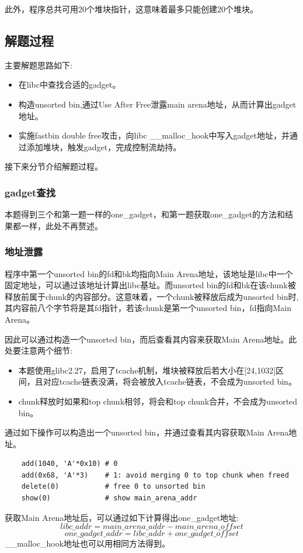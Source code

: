 此外，程序总共可用20个堆块指针，这意味着最多只能创建20个堆块。

\subsection{解题过程}
主要解题思路如下:
\begin{itemize}
    \item 在libc中查找合适的gadget。
    \item 构造unsorted bin,通过Use After Free泄露main arena地址，从而计算出gadget地址。
    \item 实施fastbin double free攻击，向libc \_\_malloc\_hook中写入gadget地址，并通过添加堆块，触发gadget，完成控制流劫持。
\end{itemize}
接下来分节介绍解题过程。

\subsubsection*{gadget查找}
本题得到三个和第一题一样的one\_gadget，和第一题获取one\_gadget的方法和结果都一样，此处不再赘述。

\subsubsection*{地址泄露}
程序中第一个unsorted bin的fd和bk均指向Main Arena地址，该地址是libc中一个固定地址，可以通过该地址计算出libc基址。而unsorted bin的fd和bk在该chunk被释放前属于chunk的内容部分。这意味着，一个chunk被释放后成为unsorted bin时,其内容前八个字节将是其fd指针，若该chunk是第一个unsorted bin，fd指向Main Arena。

因此可以通过构造一个unsorted bin，而后查看其内容来获取Main Arena地址。此处要注意两个细节:
\begin{itemize}
    \item 本题使用glibc2.27，启用了tcache机制，堆块被释放后若大小在[24,1032]区间，且对应tcache链表没满，将会被放入tcache链表，不会成为unsorted bin。
    \item chunk释放时如果和top chunk相邻，将会和top chunk合并，不会成为unsorted bin。
\end{itemize}

通过如下操作可以构造出一个unsorted bin，并通过查看其内容获取Main Arena地址。
\begin{lstlisting}
    add(1040, 'A'*0x10) # 0
    add(0x68, 'A'*3)    # 1: avoid merging 0 to top chunk when freed
    delete(0)           # free 0 to unsorted bin
    show(0)             # show main_arena_addr
\end{lstlisting}
获取Main Arena地址后，可以通过如下计算得出one\_gadget地址:
$$ libc\_addr = main\_arena\_addr - main\_arena\_offset $$
$$ one\_gadget\_addr = libc\_addr + one\_gadget\_offset $$
\_\_malloc\_hook地址也可以用相同方法得到。


